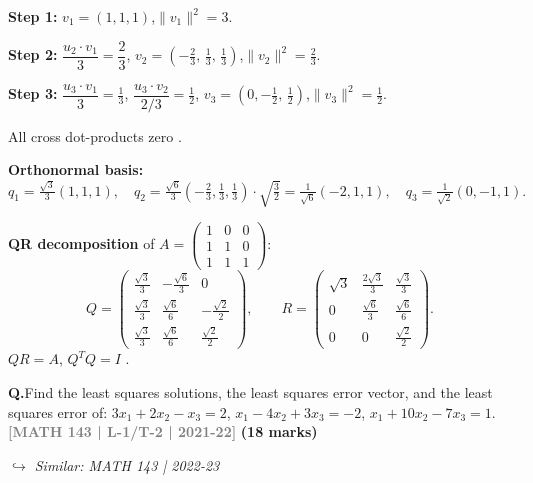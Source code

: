 \documentclass[12pt,a3paper]{article}
\newcommand{\yr}[1]{\hfill\textcolor{gray}{\small\textbf{[#1]}}}
\newcommand{\mk}[1]{\textcolor{orange!70!black}{\small\textbf{(#1 marks)}}}
\newcommand{\variant}[1]{\par\vspace{1pt}\textcolor{blue!50!black}%
  {\footnotesize\textit{$\hookrightarrow$ Similar: #1}}}
\newcounter{qnum}
\newcommand{\Q}[1]{%
  \needspace{4\baselineskip}
  \refstepcounter{qnum}
  \vspace{6pt}
  \noindent\textbf{Q\theqnum.}\enspace #1\par
}
\begin{document}
\begin{tcolorbox}[enhanced,breakable,
  colback=cD!4,colframe=cD,boxrule=0.8pt,arc=5pt,
  title={\textbf{Answer --- Gram-Schmidt $u_1=(1,1,1)$, $u_2=(0,1,1)$, $u_3=(0,0,1)$; QR Decomposition}},
  fonttitle=\bfseries\color{white},colbacktitle=cD]

\textbf{Step 1:} $v_1=(1,1,1)$,\quad $\|v_1\|^2=3$.

\textbf{Step 2:} $\dfrac{u_2\cdot v_1}{3}=\dfrac{2}{3}$,\quad
$v_2=\left(-\tfrac{2}{3},\,\tfrac{1}{3},\,\tfrac{1}{3}\right)$,\quad $\|v_2\|^2=\tfrac{2}{3}$.

\textbf{Step 3:} $\dfrac{u_3\cdot v_1}{3}=\tfrac{1}{3}$,\;
$\dfrac{u_3\cdot v_2}{2/3}=\tfrac{1}{2}$,\quad
$v_3=\left(0,-\tfrac{1}{2},\,\tfrac{1}{2}\right)$,\quad $\|v_3\|^2=\tfrac{1}{2}$.

All cross dot-products zero . \checkmark

\textbf{Orthonormal basis:}
\[
q_1=\tfrac{\sqrt{3}}{3}(1,1,1),\quad
q_2=\tfrac{\sqrt{6}}{3}\left(-\tfrac{2}{3},\tfrac{1}{3},\tfrac{1}{3}\right)\cdot\sqrt{\tfrac{3}{2}}
  =\tfrac{1}{\sqrt{6}}(-2,1,1),\quad
q_3=\tfrac{1}{\sqrt{2}}(0,-1,1).
\]

\textbf{QR decomposition} of $A=\begin{pmatrix}1&0&0\\1&1&0\\1&1&1\end{pmatrix}$:
\[
Q=\begin{pmatrix}
\frac{\sqrt{3}}{3}&-\frac{\sqrt{6}}{3}&0\\[4pt]
\frac{\sqrt{3}}{3}&\frac{\sqrt{6}}{6}&-\frac{\sqrt{2}}{2}\\[4pt]
\frac{\sqrt{3}}{3}&\frac{\sqrt{6}}{6}&\frac{\sqrt{2}}{2}
\end{pmatrix},\qquad
R=\begin{pmatrix}
\sqrt{3}&\frac{2\sqrt{3}}{3}&\frac{\sqrt{3}}{3}\\[4pt]
0&\frac{\sqrt{6}}{3}&\frac{\sqrt{6}}{6}\\[4pt]
0&0&\frac{\sqrt{2}}{2}
\end{pmatrix}.
\]
$QR=A$, $Q^TQ=I$ . \checkmark

\end{tcolorbox}

\Q{Find the least squares solutions, the least squares error vector, and the least squares error of:
$3x_1 + 2x_2 - x_3 = 2$, $x_1 - 4x_2 + 3x_3 = -2$, $x_1 + 10x_2 - 7x_3 = 1$.
\yr{MATH 143 | L-1/T-2 | 2021-22} \mk{18}
\variant{MATH 143 | 2022-23}}
\end{document}

